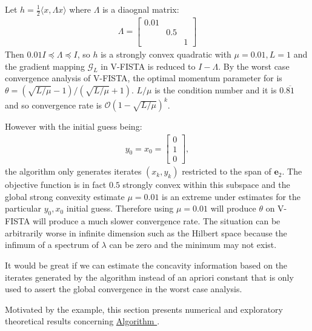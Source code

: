 \documentclass[12pt]{article}
\begin{document}
    \begin{example}
        Let $h = \frac{1}{2}\langle x, \Lambda x\rangle$ where $\Lambda$ is a diaognal matrix: 
        \begin{align*}
            \Lambda = \begin{bmatrix}
                0.01 & & 
                \\
                & 0.5 & \\ 
                & & 1
            \end{bmatrix}
        \end{align*}
        Then $0.01 I \preceq \Lambda \preceq I$, so $h$ is a strongly convex quadratic with $\mu = 0.01, L = 1$ and the gradient mapping $\mathcal G_L$ in V-FISTA is reduced to $I - \Lambda$. 
        By the worst case convergence analysis of V-FISTA, the optimal momentum parameter for is $\theta = \left(\sqrt{L/\mu} - 1\right)/\left(\sqrt{L/\mu} + 1\right)$. 
        $L/\mu$ is the condition number and it is $0.\overline{81}$ and 
        so convergence rate is $\mathcal O\left(1 - \sqrt{L/\mu}\right)^k$. 
        \par
        However with the initial guess being:
        \begin{align*}
            y_0 = x_0 = \begin{bmatrix}
                0 \\ 1 \\ 0
            \end{bmatrix}, 
        \end{align*}
        the algorithm only generates iterates $(x_k, y_k)$ restricted to the span of $\mathbf e_2$. 
        The objective function is in fact $0.5$ strongly convex within this subspace and the global strong convexity estimate $\mu = 0.01$ is an extreme under estimates for the particular $y_0, x_0$ initial guess. 
        Therefore using $\mu=0.01$ will produce $\theta$ on V-FISTA will produce a much slower convergence rate. 
        The situation can be arbitrarily worse in infinite dimension such as the Hilbert space because the infimum of a spectrum of $\lambda$ can be zero and the minimum may not exist. 
        \par
        It would be great if we can estimate the concavity information based on the iterates generated by the algorithm instead of an apriori constant that is only used to assert the global convergence in the worst case analysis. 
    \end{example}
    Motivated by the example, this section presents numerical and exploratory theoretical results concerning \hyperref[alg:inexact-vfista]{Algorithm }. 
\end{document}
